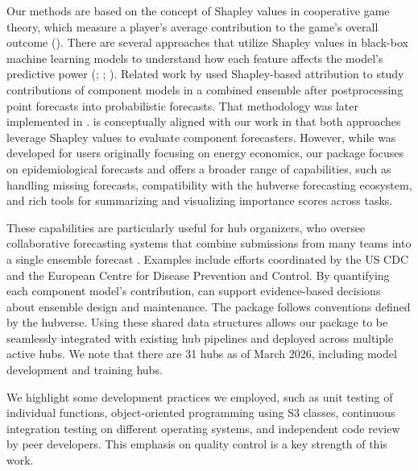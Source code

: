 \documentclass[
  article,
  shortnames,
  notitle]{jss}
\begin{document}
Our methods are based on the concept of Shapley values in cooperative
game theory, which measure a player's average contribution to the game's
overall outcome (\citet{Shapley1953}). There are several approaches that
utilize Shapley values in black-box machine learning models to
understand how each feature affects the model's predictive power
(\citet{lundberg2017unified}; \citet{lundberg2020local};
\citet{covert2020understanding}). Related work by
\citet{lipiecki2024postprocessing} used Shapley-based attribution to
study contributions of component models in a combined ensemble after
postprocessing point forecasts into probabilistic forecasts. That
methodology was later implemented in 
\citep{Jlpackage-lipiecki2025postforecast}.  is
conceptually aligned with our work in that both approaches leverage
Shapley values to evaluate component forecasters. However, while
 was developed for  users
originally focusing on energy economics, our  package
focuses on epidemiological forecasts and offers a broader range of
capabilities, such as handling missing forecasts, compatibility with the
hubverse forecasting ecosystem, and rich tools for summarizing and
visualizing importance scores across tasks.

These capabilities are particularly useful for hub organizers, who
oversee collaborative forecasting systems that combine submissions from
many teams into a single ensemble forecast \citep{shandross2026multi}.
Examples include efforts coordinated by the US CDC and the European
Centre for Disease Prevention and Control. By quantifying each component
model's contribution,  can support evidence-based
decisions about ensemble design and maintenance. The package follows
conventions defined by the hubverse. Using these shared data structures
allows our package to be seamlessly integrated with existing hub
pipelines and deployed across multiple active hubs. We note that there
are 31 hubs as of March 2026, including model development and training
hubs.

We highlight some development practices we employed, such as unit
testing of individual functions, object-oriented programming using S3
classes, continuous integration testing on different operating systems,
and independent code review by peer developers. This emphasis on quality
control is a key strength of this work.
\end{document}
